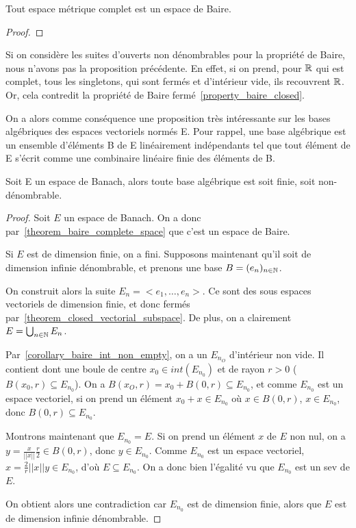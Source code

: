 \begin{theorem} 
\label{theorem_baire_complete_space}
	Tout espace métrique complet est un espace de Baire.
\end{theorem}

\begin{proof}
	
\end{proof}

\begin{remarque}
	Si on considère les suites d'ouverts non dénombrables pour la propriété de
	Baire, nous n'avons pas la proposition précédente.
	En effet, si on prend, pour $\mathbb{R}$ qui est complet, tous les singletons,
	qui sont fermés et d'intérieur vide, ils recouvrent $\mathbb{R}$. Or, cela
	contredit la propriété de Baire fermé~\ref{property_baire_closed}.
\end{remarque}

On a alors comme conséquence une proposition très intéressante sur les bases
algébriques des espaces vectoriels normés E. Pour rappel, une base algébrique
est un ensemble d'éléments B de E linéairement indépendants tel que tout élément
de E s'écrit comme une combinaire linéaire finie des éléments de B.

\begin{proposition}
\label{proposition_basis_banach_space}
	Soit E un espace de Banach, alors toute base algébrique est soit finie, soit
	non-dénombrable.
\end{proposition}

\begin{proof}
	Soit $E$ un espace de Banach. On a donc
	par~\ref{theorem_baire_complete_space} que c'est un espace de Baire.

	Si $E$ est de dimension finie, on a fini.
	Supposons maintenant qu'il soit de dimension infinie dénombrable, et prenons
	une base $B = (e_{n})_{n \in \mathbb{N}}$.

	On construit alors la suite $E_{n} = <e_{1}, \ldots, e_{n}>$. Ce sont des
	sous espaces vectoriels de dimension finie, et donc fermés
	par~\ref{theorem_closed_vectorial_subspace}. De plus, on a
	clairement $E = \bigcup_{n \in \mathbb{N}} E_{n}$.

	Par~\ref{corollary_baire_int_non_empty}, on a un $E_{n_{O}}$ d'intérieur non
	vide. Il contient dont une boule de centre $x_{0} \in int({E_{n_{0}}})$ et
	de rayon $r > 0$ ($B(x_{0}, r) \subseteq E_{n_{0}}$).
	On a $B(x_{O}, r) = x_{0} + B(0, r) \subseteq E_{n_{0}}$, et comme
	$E_{n_{0}}$ est un espace vectoriel, si on prend un élément $x_{0} + x \in
	E_{n_{0}}$ où $x \in B(0, r)$, $x \in E_{n_{0}}$, donc $B(0, r) \subseteq
	E_{n_{0}}$.

	Montrons maintenant que $E_{n_{0}} = E$. Si on prend un élément $x$ de $E$
	non nul, on a $y = \frac{x}{||x||} \frac{r}{2} \in B(0, r)$, donc $y \in
	E_{n_{0}}$. Comme $E_{n_{0}}$ est un espace vectoriel, $x = \frac{2}{r}
	||x|| y \in E_{n_{0}}$, d'où $E \subseteq E_{n_{0}}$. On a donc bien
	l'égalité vu que $E_{n_{0}}$ est un sev de $E$.

	On obtient alors une contradiction car $E_{n_{0}}$ est de dimension finie,
	alors que $E$ est de dimension infinie dénombrable.
\end{proof}

